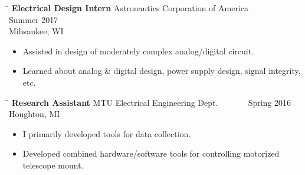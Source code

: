 \documentclass[letterpaper]{res}
\begin{document}
\begin{resume}
  \vspace{-0.15in}
  \begin{tabbing}
    \hspace{2.3in}\= \hspace{2.6in}\= \kill %
    {\bf Electrical Design Intern} \>Astronautics Corporation of America \> ~~~~~~ Summer 2017\\
    \> Milwaukee, WI
  \end{tabbing}\vspace{-10pt}
  \begin{itemize} \itemsep1pt \parskip0pt 
    \item Assisted in design of moderately complex analog/digital circuit.
    \item Learned about analog \& digital design, power supply design, signal integrity, etc.
  \end{itemize}


  \vspace{-0.15in}
  \begin{tabbing}
    \hspace{2.3in}\= \hspace{2.6in}\= \kill %
    {\bf Research Assistant} \>MTU Electrical Engineering Dept. \> ~~~~~~ Spring 2016\\
    \>Houghton, MI
  \end{tabbing}\vspace{-10pt}
  \begin{itemize} \itemsep1pt \parskip0pt 
    \item I primarily developed tools for data collection.
	\item Developed combined hardware/software tools for controlling motorized telescope mount.
  \end{itemize}


\end{resume}
\end{document}

